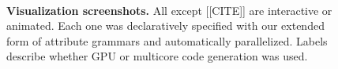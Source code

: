 \begin{figure}
{\begin{minipage}{0.5\columnwidth}
\end{minipage}}
\\
\caption{\textbf{Visualization screenshots.} All except [[CITE]] are interactive or animated. Each one was declaratively specified with our extended form of attribute grammars and automatically parallelized. Labels describe whether GPU or multicore code generation was used.}
\label{fig:vizrenderings}
\end{figure}

